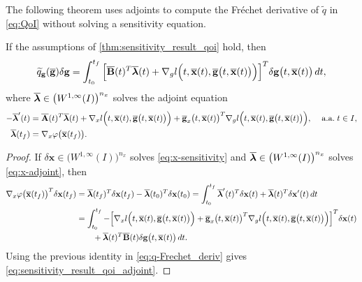 \documentclass[onefignum,onetabnum]{siamart220329}
\numberwithin{equation}{section}
\newcommand{\aall}{\mbox{ a.a.} \;}
\newcommand{\bg}{\ensuremath{\mathbf{g}}} %
\newcommand{\bx}{\ensuremath{\mathbf{x}}} %
\newcommand {\blambda} {\mbox{\boldmath $\lambda$}}
\newcommand{\BA}{\ensuremath{\mathbf{A}} } %
\newcommand{\BB}{\ensuremath{\mathbf{B}} } %
\newcommand{\WW}{\big( W^{1, \infty}(I) \big)^{n_x}}
\begin{document}
The following theorem uses adjoints to compute the Fr\'echet derivative of $\widetilde{q}$ in \cref{eq:QoI} without solving a sensitivity equation.
\begin{theorem} \label{thm:qoi-sensitivity-g-dependent}
	If the assumptions of \cref{thm:sensitivity_result_qoi} hold, 
    then 
    \begin{equation} \label{eq:sensitivity_result_qoi_adjoint}
    	\widetilde{q}_\bg(\overline{\bg}) \delta \bg = \int_{t_0}^{t_f} \Big[ \overline{\BB}(t)^T \overline{\blambda}(t) + \nabla_g l \Big( t, \overline{\bx}(t), \overline{\bg} \big( t, \overline{\bx}(t) \big) \Big) \Big]^T \delta \bg \big( t, \overline{\bx}(t) \big) \, dt,
    \end{equation}
    where $\overline{\blambda} \in \WW$ solves the adjoint equation
       	\begin{equation} \label{eq:x-adjoint}
	\begin{aligned}
	       - \overline{\blambda}'(t) &=\overline{\BA}(t)^T \overline{\blambda}(t) + \nabla_x l\Big(t, \overline{\bx}(t), \overline{\bg} \big( t, \overline{\bx}(t) \big) \Big) 
	       + \overline{\bg}_x\big(t, \overline{\bx}(t) \big)^T \nabla_g l\Big( t, \overline{\bx}(t), \overline{\bg}\big(t, \overline{\bx}(t) \big) \Big), & \aall t \in I, \\
		\overline{\blambda}(t_f) &= \nabla_x \varphi\big(   \overline{\bx}(t_f) \big).
	\end{aligned}
   \end{equation}
\end{theorem}
\begin{proof}
If  $\delta \bx \in \WW$ solves \cref{eq:x-sensitivity} and $\overline{\blambda} \in \WW$ solves \cref{eq:x-adjoint}, then
   \begin{align*}
         \nabla_x \varphi\big(   \overline{\bx}(t_f) \big)^T  \delta \bx(t_f)
         &= \overline{\blambda}(t_f)^T \delta \bx(t_f) - \overline{\blambda}(t_0)^T \delta \bx(t_0)
            =  \int_{t_0}^{t_f} \overline{\blambda}'(t)^T \delta \bx(t) + \overline{\blambda}(t)^T \delta \bx'(t) \, dt \\
         & = \int_{t_0}^{t_f} -\Big[ \nabla_x l\Big( t, \overline{\bx}(t), \overline{\bg}\big(t, \overline{\bx}(t) \big) \Big) 
	              + \overline{\bg}_x\big(t, \overline{\bx}(t) \big)^T \nabla_g l\Big( t, \overline{\bx}(t), \overline{\bg}\big(t, \overline{\bx}(t) \big) \Big) \Big]^T \delta \bx(t) \\ &\qquad + \overline{\blambda}(t)^T \overline{\BB}(t) \delta \bg\big( t,  \overline{\bx}(t) \big) \, dt.
   \end{align*}
   Using the previous identity in \cref{eq:q-Frechet_deriv} gives \cref{eq:sensitivity_result_qoi_adjoint}.
\end{proof}
\end{document}
